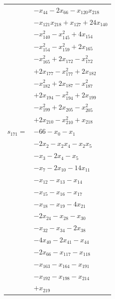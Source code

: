 \begin{longtable}{@{}r@{\;}l@{}}
 & \(\displaystyle -x_{44} -2x_{66} -x_{120}x_{218}\) \\
 & \(\displaystyle -x_{121}x_{218} +x_{127} +24x_{140}\) \\
 & \(\displaystyle -x_{140}^{2} -x_{145}^{2} +4x_{154}\) \\
 & \(\displaystyle -x_{154}^{2} -x_{159}^{2} +2x_{165}\) \\
 & \(\displaystyle -x_{165}^{2} +2x_{172} -x_{172}^{2}\) \\
 & \(\displaystyle +2x_{177} -x_{177}^{2} +2x_{182}\) \\
 & \(\displaystyle -x_{182}^{2} +2x_{187} -x_{187}^{2}\) \\
 & \(\displaystyle +2x_{194} -x_{194}^{2} +2x_{199}\) \\
 & \(\displaystyle -x_{199}^{2} +2x_{205} -x_{205}^{2}\) \\
 & \(\displaystyle +2x_{210} -x_{210}^{2} +x_{218}\) \\[3pt]
\(s_{171}=\) & \(\displaystyle -66 -x_{0} -x_{1}\) \\
 & \(\displaystyle -2x_{2} -x_{2}x_{4} -x_{2}x_{5}\) \\
 & \(\displaystyle -x_{3} -2x_{4} -x_{5}\) \\
 & \(\displaystyle -x_{7} -2x_{10} -14x_{11}\) \\
 & \(\displaystyle -x_{12} -x_{13} -x_{14}\) \\
 & \(\displaystyle -x_{15} -x_{16} -x_{17}\) \\
 & \(\displaystyle -x_{18} -x_{19} -4x_{21}\) \\
 & \(\displaystyle -2x_{24} -x_{28} -x_{30}\) \\
 & \(\displaystyle -x_{32} -x_{34} -2x_{38}\) \\
 & \(\displaystyle -4x_{40} -2x_{41} -x_{44}\) \\
 & \(\displaystyle -2x_{66} -x_{117} -x_{118}\) \\
 & \(\displaystyle -x_{163} -x_{164} -x_{191}\) \\
 & \(\displaystyle -x_{192} -x_{198} -x_{214}\) \\
 & \(\displaystyle +x_{219}\) \\[3pt]
\end{longtable}
\endgroup
